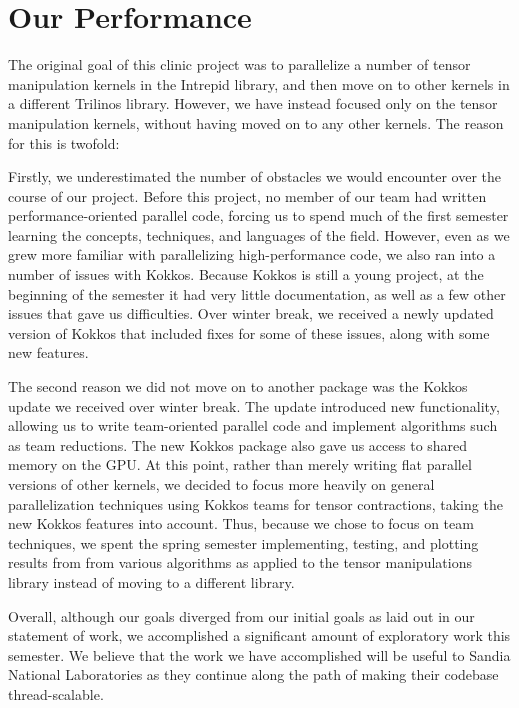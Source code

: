 
\chapter{Our Performance}

The original goal of this clinic project was to parallelize a number of tensor
manipulation kernels in the Intrepid library, and then move on to other kernels
in a different Trilinos library.  However, we have instead focused only on the
tensor manipulation kernels, without having moved on to any other kernels. The
reason for this is twofold:

Firstly, we underestimated the number of obstacles we would encounter over the
course of our project.  Before this project, no member of our team had written
performance-oriented parallel code, forcing us to spend much of the first
semester learning the concepts, techniques, and languages of the field.
However, even as we grew more familiar with parallelizing high-performance code,
we also ran into a number of issues with Kokkos.  Because Kokkos is still a
young project, at the beginning of the semester it had very little
documentation, as well as a few other issues that gave us difficulties.  Over
winter break, we received a newly updated version of Kokkos that included fixes
for some of these issues, along with some new features.

The second reason we did not move on to another package was the Kokkos update we
received over winter break.  The update introduced new functionality, allowing
us to write team-oriented parallel code and implement algorithms such as team
reductions.  The new Kokkos package also gave us access to shared memory on the
GPU. At this point, rather than merely writing flat parallel versions of other
kernels, we decided to focus more heavily on general parallelization techniques
using Kokkos teams for tensor contractions, taking the new Kokkos features into
account.  Thus, because we chose to focus on team techniques, we spent the
spring semester implementing, testing, and plotting results from from various
algorithms as applied to the tensor manipulations library instead of moving to a
different library.

Overall, although our goals diverged from our initial goals as laid out in our 
statement of work, we accomplished a significant amount of exploratory work this
semester. We believe that the work we have accomplished will be useful to Sandia 
National Laboratories as they continue along the path of making their codebase
thread-scalable.
